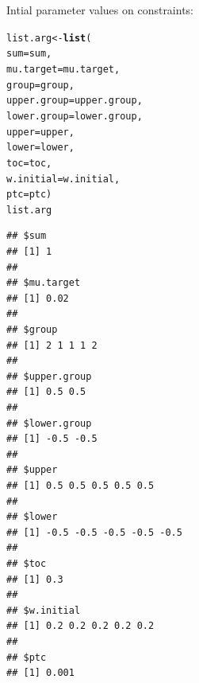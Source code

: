 \documentclass{uwstat518}\usepackage[]{graphicx}\usepackage[]{color}
\makeatletter
\newcommand{\hlkwd}[1]{\textcolor[rgb]{0.737,0.353,0.396}{\textbf{#1}}}%
\newenvironment{kframe}{%
 \def\at@end@of@kframe{}%
 \ifinner\ifhmode%
  \def\at@end@of@kframe{\end{minipage}}%
  \begin{minipage}{\columnwidth}%
 \fi\fi%
 \def\FrameCommand##1{\hskip\@totalleftmargin \hskip-\fboxsep
 \colorbox{shadecolor}{##1}\hskip-\fboxsep
     \hskip-\linewidth \hskip-\@totalleftmargin \hskip\columnwidth}%
 \MakeFramed {\advance\hsize-\width
   \@totalleftmargin\z@ \linewidth\hsize
   \@setminipage}}%
 {\par\unskip\endMakeFramed%
 \at@end@of@kframe}
\newenvironment{knitrout}{}{} %
\makeatother
\begin{document}
Intial parameter values on constraints:
\begin{knitrout}
\color{fgcolor}\begin{kframe}
\begin{alltt}
list.arg <- \hlkwd{list}(
		sum=sum,
		mu.target=mu.target, 
		group=group, 
		upper.group=upper.group,
		lower.group=lower.group, 
		upper=upper, 
		lower=lower, 
		toc=toc, 
		w.initial=w.initial,
		ptc=ptc)	
list.arg
\end{alltt}
\begin{verbatim}
## $sum
## [1] 1
## 
## $mu.target
## [1] 0.02
## 
## $group
## [1] 2 1 1 1 2
## 
## $upper.group
## [1] 0.5 0.5
## 
## $lower.group
## [1] -0.5 -0.5
## 
## $upper
## [1] 0.5 0.5 0.5 0.5 0.5
## 
## $lower
## [1] -0.5 -0.5 -0.5 -0.5 -0.5
## 
## $toc
## [1] 0.3
## 
## $w.initial
## [1] 0.2 0.2 0.2 0.2 0.2
## 
## $ptc
## [1] 0.001
\end{verbatim}
\end{kframe}
\end{knitrout}

\newpage
\end{document}
